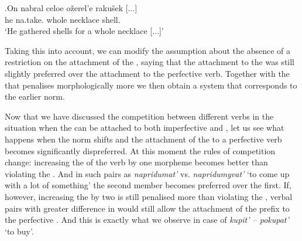 \exg.\label{ex:nabrat}On nabral celoe o\v{z}erel'e raku\v{s}ek [$\ldots$]\\
he na.take. whole necklace shell.\\
\trans `He gathered shells for a whole necklace [$\ldots$]'\\

Taking this into account, we can modify the assumption about the absence of a restriction on the attachment of the  , saying that the attachment to the  was still slightly preferred over the attachment to the perfective verb. Together with the  that penalises morphologically more  we then obtain a system that corresponds to the earlier norm. 

Now that we have discussed the competition between different verbs in the situation when the   can be attached to both imperfective and , let us see what happens when the norm shifts and the attachment of the   to a perfective verb becomes significantly dispreferred. At this moment the rules of competition change: increasing the  of the verb by one morpheme becomes better than violating the . And in such pairs as \textit{napridumat'} vs. \textit{napridumyvat'} `to come up with a lot of something' the second member becomes preferred over the first. If, however, increasing the  by two is still penalised more than violating the , verbal pairs with greater difference in  would still allow the attachment of the  prefix  to the perfective . And this is exactly what we observe in case of \textit{kupit' -- pokupat'} `to buy'.

